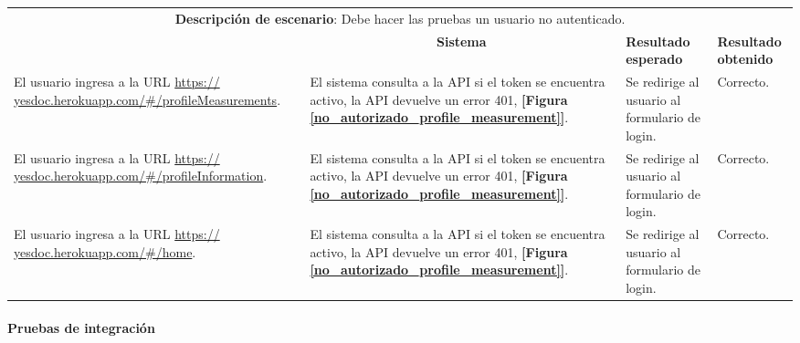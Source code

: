   \begin{center}
  	\begin{longtable}{|m{4cm}|m{4cm}|m{3cm}|m{2cm}|}
  		\hline \rowcolor[gray]{0.9}
  		\multicolumn{4}{|c|}{\textbf{Procedimiento de pruebas}} \\
  		\hline 
  		
  		\multicolumn{4}{|c|}{\textbf{Descripción de escenario}: Debe hacer las pruebas un usuario no autenticado.} \\
  		\hline 
  		
  		\rowcolor[gray]{0.9}
  		\multicolumn{1}{|c|}{\textbf{Actor}} &
  		\multicolumn{1}{c|}{\textbf{Sistema}} &
  		\textbf{Resultado esperado}&
  		\textbf{Resultado obtenido} \\
  		\hline
  		\endhead
  		El usuario ingresa a la URL \url{https:// yesdoc.herokuapp.com/#/profileMeasurements}.
  		&
  		El sistema consulta a la API si el token se encuentra activo, la API devuelve un error 401, \textbf{[Figura \ref{no_autorizado_profile_measurement}]}.
  		&
  		Se redirige al usuario al formulario de login.
  		&
  		Correcto.
  		\\ 
  		\hline
  		El usuario ingresa a la URL \url{https:// yesdoc.herokuapp.com/#/profileInformation}.
  		&
  		El sistema consulta a la API si el token se encuentra activo, la API devuelve un error 401, \textbf{[Figura \ref{no_autorizado_profile_measurement}]}.
  		&
  		Se redirige al usuario al formulario de login.
  		&
  		Correcto.
  		\\ 
  		\hline
  		El usuario ingresa a la URL \url{https:// yesdoc.herokuapp.com/#/home}.
  		&
  		El sistema consulta a la API si el token se encuentra activo, la API devuelve un error 401, \textbf{[Figura \ref{no_autorizado_profile_measurement}]}.
  		&
  		Se redirige al usuario al formulario de login.
  		&
  		Correcto.
  		\\ 
  		\hline
  		
  	\end{longtable}
  \end{center}
  
  \paragraph{Pruebas de integración}
  
